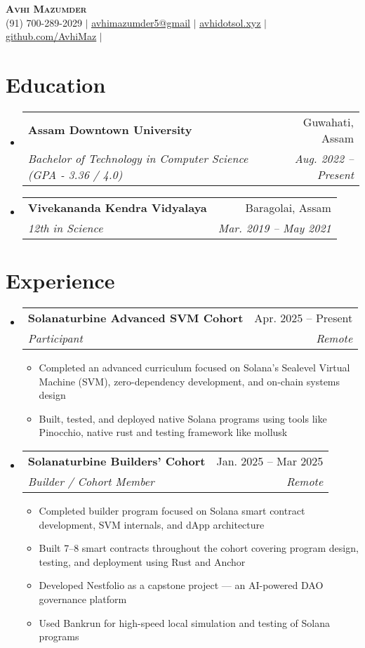 \documentclass[letterpaper,11pt]{article}
\makeatletter
\newcommand{\resumeItem}[1]{
  \item\small{
    {#1 \vspace{-2pt}}
  }
}
\newcommand{\resumeSubheading}[4]{
  \vspace{-2pt}\item
    \begin{tabular*}{0.97\textwidth}[t]{l@{\extracolsep{\fill}}r}
      \textbf{#1} & #2 \\
      \textit{\small#3} & \textit{\small #4} \\
    \end{tabular*}\vspace{-7pt}
}
\newcommand{\resumeSubHeadingListStart}{\begin{itemize}[leftmargin=0.15in, label={}]}
\newcommand{\resumeSubHeadingListEnd}{\end{itemize}}
\newcommand{\resumeItemListStart}{\begin{itemize}}
\newcommand{\resumeItemListEnd}{\end{itemize}\vspace{-5pt}}
\makeatother
\begin{document}
\begin{center}
    \textbf{\Huge \scshape Avhi Mazumder} \\ \vspace{1pt}
    \small (91) 700-289-2029 $|$ \href{mailto:avhimazumder5@gmail.com}{\underline{avhimazumder5@gmail}} $|$ 
    \href{https://avhidotsol.xyz/}{\underline{avhidotsol.xyz}} $|$
    \href{https://github.com/AvhiMaz}{\underline{github.com/AvhiMaz}} $|$
\end{center}


\section{Education}
  \resumeSubHeadingListStart
    \resumeSubheading
      {Assam Downtown University}{Guwahati, Assam}
      {Bachelor of Technology in Computer Science (GPA - 3.36 / 4.0)}{Aug. 2022 -- Present}
    \resumeSubheading
      {Vivekananda Kendra Vidyalaya}{Baragolai, Assam}
      {12th in Science}{Mar. 2019 -- May 2021}
  \resumeSubHeadingListEnd


\section{Experience}
  \resumeSubHeadingListStart

    \resumeSubheading
      {Solanaturbine Advanced SVM Cohort}{Apr. 2025 -- Present}
      {Participant}{Remote}
      \resumeItemListStart
        \resumeItem{Completed an advanced curriculum focused on Solana's Sealevel Virtual Machine (SVM), zero-dependency development, and on-chain systems design}
        \resumeItem{Built, tested, and deployed native Solana programs using tools like Pinocchio, native rust and testing framework like mollusk}
      \resumeItemListEnd
    \resumeSubheading
      {Solanaturbine Builders' Cohort}{Jan. 2025 -- Mar 2025}
      {Builder / Cohort Member}{Remote}
    \resumeItemListStart
      \resumeItem{Completed builder program focused on Solana smart contract development, SVM internals, and dApp architecture}
      \resumeItem{Built 7–8 smart contracts throughout the cohort covering program design, testing, and deployment using Rust and Anchor}
      \resumeItem{Developed Nestfolio as a capstone project — an AI-powered DAO governance platform}
      \resumeItem{Used Bankrun for high-speed local simulation and testing of Solana programs}
    \resumeItemListEnd
  \resumeSubHeadingListEnd
\end{document}
